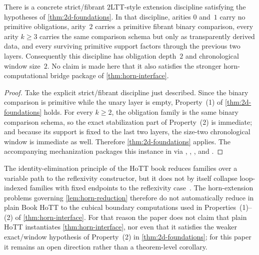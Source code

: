 \documentclass{lmcs}
\begin{document}
\begin{cor}
\label{cor:2ltt-instantiation}
There is a concrete strict/fibrant $2$LTT-style extension discipline satisfying the hypotheses of \autoref{thm:2d-foundations}. In that discipline, arities $0$ and~$1$ carry no primitive obligations, arity~$2$ carries a primitive fibrant binary comparison, every arity $k \geq 3$ carries the same comparison schema but only as transparently derived data, and every surviving primitive support factors through the previous two layers. Consequently this discipline has obligation depth~$2$ and chronological window size~$2$. No claim is made here that it also satisfies the stronger horn-computational bridge package of \autoref{thm:horn-interface}.
\end{cor}

\begin{proof}
Take the explicit strict/fibrant discipline just described. Since the binary comparison is primitive while the unary layer is empty, Property~(1) of \autoref{thm:2d-foundations} holds. For every $k \geq 2$, the obligation family is the same binary comparison schema, so the exact stabilization part of Property~(2) is immediate; and because its support is fixed to the last two layers, the size-two chronological window is immediate as well. Therefore \autoref{thm:2d-foundations} applies. The accompanying mechanization packages this instance in  via , , , and .
\end{proof}

\begin{rem}
\label{rem:hott-scope}
The identity-elimination principle of the HoTT book reduces families over a variable path to the reflexivity constructor, but it does not by itself collapse loop-indexed families with fixed endpoints to the reflexivity case~\cite{hott}. The horn-extension problems governing \autoref{lem:horn-reduction} therefore do not automatically reduce in plain Book HoTT to the cubical boundary computations used in Properties~(1)--(2) of \autoref{thm:horn-interface}. For that reason the paper does not claim that plain HoTT instantiates \autoref{thm:horn-interface}, nor even that it satisfies the weaker exact/window hypothesis of Property~(2) in \autoref{thm:2d-foundations}; for this paper it remains an open direction rather than a theorem-level corollary.
\end{rem}
\end{document}
